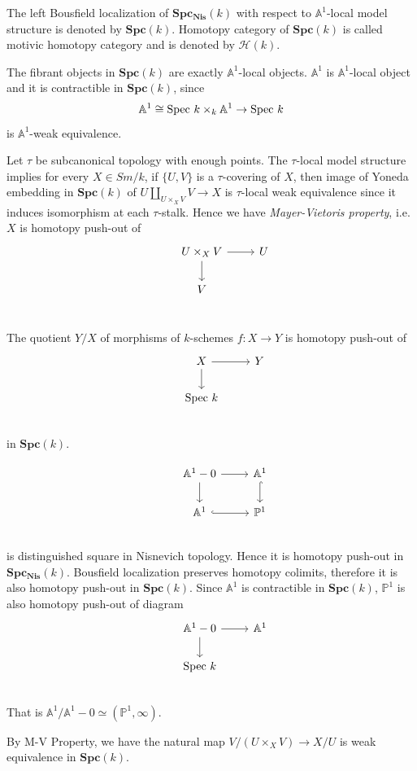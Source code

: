 \documentclass[b5paper,10pt]{article}
\begin{document}
\begin{secdefn}
	The left Bousfield localization of $\mathbf{Spc_{Nis}}(k)$ with respect to $\mathbb{A}^1$-local model structure is denoted by $\mathbf{Spc}(k)$. Homotopy category of $\mathbf{Spc}(k)$ is called motivic homotopy category and is denoted by $\mathcal{H}(k)$.
\end{secdefn}
The fibrant objects in $\mathbf{Spc}(k)$ are exactly $\mathbb{A}^1$-local objects. $\mathbb{A}^1$ is $\mathbb{A}^1$-local object and it is contractible in $\mathbf{Spc}(k)$, since
\[
\mathbb{A}^1 \cong \text{Spec } k \times_k \mathbb{A}^1 \to \text{Spec } k
\]
is $\mathbb{A}^1$-weak equivalence.

Let $\tau$ be  subcanonical topology with enough points. The $\tau$-local model structure implies for every $X \in Sm/k$, if $\{U,V\}$ is a $\tau$-covering of $X$, then image of Yoneda embedding in $\mathbf{Spc}(k)$ of $U\coprod_{U \times_X V} V \to X$
is $\tau$-local weak equivalence since it induces isomorphism at each $\tau$-stalk. Hence we have \emph{Mayer-Vietoris property}, i.e.\ $X$ is homotopy push-out of 
\[
\begin{tikzcd}
&U\times_X V \arrow[r] \arrow[d] & U\\
&V& \\
\end{tikzcd}
\]
\begin{secdefn}
	The quotient $Y/X$ of morphisms of $k$-schemes $f\colon  X \to Y$ is homotopy    push-out of 
	\[
	\begin{tikzcd}
	&X \arrow[r] \arrow[d]& Y \\
	& \spec k &\\
	\end{tikzcd}
	\]
	in $\mathbf{Spc}(k)$.
\end{secdefn}
\begin{ex}
	\[
	\begin{tikzcd}
	&\mathbb{A}^1 -0 \arrow[r] \arrow[d]& \mathbb{A}^1 \ar[d,hook]\\
	& \mathbb{A}^1 \ar[r,hook]& \mathbb{P}^1\\
	\end{tikzcd}
	\]
	is distinguished square in Nisnevich topology. Hence it is homotopy push-out in $\mathbf{Spc_{Nis}}(k)$. Bousfield localization preserves homotopy colimits, therefore it is also homotopy push-out in $\mathbf{Spc}(k)$. Since $\mathbb{A}^1$ is contractible in $\mathbf{Spc}(k)$, $\mathbb{P}^1$ is also homotopy push-out of diagram
	\[
	\begin{tikzcd}
	&\mathbb{A}^1 -0 \arrow[r] \arrow[d]& \mathbb{A}^1 \\
	& \spec k &\\
	\end{tikzcd}
	\] 
	That is $\mathbb{A}^1/\mathbb{A}^1 -0 \simeq (\mathbb{P}^1,\infty)$.
\end{ex}
By M-V Property, we have the natural map $V/(U \times_X V) \to X/U$ is weak equivalence in $\mathbf{Spc}(k)$.
\end{document}

